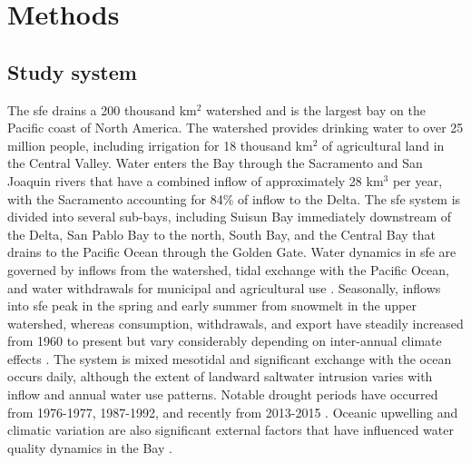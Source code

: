 \documentclass[letterpaper,12pt,oneside]{article}\usepackage[]{graphicx}\usepackage[]{color}
\begin{document}
\section{Methods}

\subsection{Study system}

The \ac{sfe} drains a 200 thousand km$^2$ watershed and is the largest bay on the Pacific coast of North America.  The watershed provides drinking water to over 25 million people, including irrigation for 18 thousand km$^2$ of agricultural land in the Central Valley.  Water enters the Bay through the Sacramento and San Joaquin rivers that have a combined inflow of approximately 28 km$^3$ per year, with the Sacramento accounting for 84\% of inflow to the Delta.  The \ac{sfe} system is divided into several sub-bays, including Suisun Bay immediately downstream of the Delta, San Pablo Bay to the north, South Bay, and the Central Bay that drains to the Pacific Ocean through the Golden Gate.  Water dynamics in \ac{sfe} are governed by inflows from the watershed, tidal exchange with the Pacific Ocean, and water withdrawals for municipal and agricultural use \citep{Jassby00}.  Seasonally, inflows into \ac{sfe} peak in the spring and early summer from snowmelt in the upper watershed, whereas consumption, withdrawals, and export have steadily increased from 1960 to present but vary considerably depending on inter-annual climate effects \citep{Cloern12b}.  The system is mixed mesotidal and significant exchange with the ocean occurs daily, although the extent of landward saltwater intrusion varies with inflow and annual water use patterns. Notable drought periods have occurred from 1976-1977, 1987-1992, and recently from 2013-2015 \citep{Cloern15}.  Oceanic upwelling and climatic variation are also significant external factors that have influenced water quality dynamics in the Bay \citep{Cloern07}.
\end{document}
